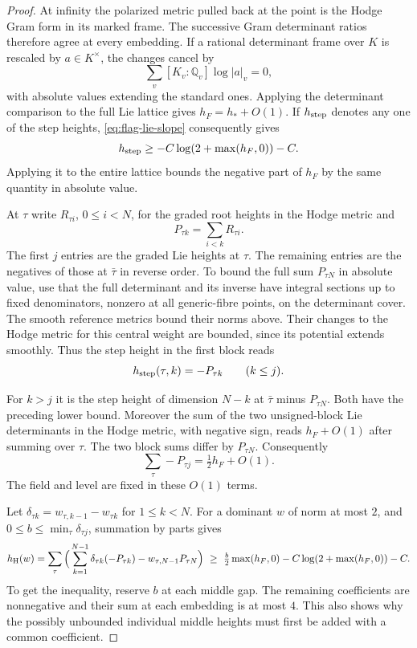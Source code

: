 \begin{proof}
At infinity the polarized metric pulled back at the point
is the Hodge Gram form in its marked frame. The successive Gram
determinant ratios therefore agree at every embedding. If a rational determinant frame over \(K\) is rescaled by \(a\in K^\times\), the changes cancel by
\[
 \sum_v[K_v:\mathbb Q_v]\log |a|_v=0,
\]
with absolute values extending the standard ones. Applying the determinant comparison to the full Lie lattice gives
\(h_F=h_*+O(1)\). If \(h_{\rm step}\) denotes any one of the step
heights, \eqref{eq:flag-lie-slope} consequently gives
\[
                    h_{\rm step}\ge-C\log(2+\max(h_F,0))-C .
\]
Applying it to the entire lattice bounds the negative part of
\(h_F\) by the same quantity in absolute value.
\label{cor:flag-point-heights-3}

At \(\tau\) write \(R_{\tau i}\), \(0\le i<N\), for the
graded root heights in the Hodge metric and
\[
 P_{\tau k}= \sum_{i<k} R_{\tau i}.
\]
The first \(j\) entries are the
graded Lie heights at \(\tau\). The remaining entries are
the negatives of those at \(\bar\tau\) in reverse order.
To bound the full sum \(P_{\tau N}\) in absolute value, use that
the full determinant and its inverse have integral sections up
to fixed denominators, nonzero at all generic-fibre points,
on the determinant cover. The smooth reference metrics bound their
norms above. Their changes to the Hodge metric for this central
weight are bounded, since its potential extends smoothly. Thus the step height in the first block reads
\[
 h_{\rm step}(\tau,k)=-P_{\tau k}\qquad(k\le j).
\]

For \(k>j\) it is the step height of dimension \(N-k\) at
\(\bar\tau\) minus \(P_{\tau N}\). Both have the preceding lower
bound. Moreover the sum of the two unsigned-block Lie determinants
in the Hodge metric, with negative sign, reads \(h_F+O(1)\) after
summing over \(\tau\). The two block sums differ by \(P_{\tau N}\).
Consequently
\[
  \sum_\tau -P_{\tau j}=\tfrac12 h_F+O(1).
\]
The field and level are fixed in these \(O(1)\) terms.
\label{cor:flag-point-heights-4}

Let \(\delta_{\tau k}=w_{\tau,k-1}-w_{\tau k}\) for \(1\le k<N\).
For a dominant \(w\) of norm at most \(2\), and
\(0\le b\le\min_\tau\delta_{\tau j}\), summation by parts gives
\[
 h_{\rm H}(w)=
 \sum_\tau\Big(\sum_{k=1}^{N-1}\delta_{\tau k}(-P_{\tau k})
                      -w_{\tau,N-1}P_{\tau N}\Big)
 \ \ge\ \tfrac b2\max(h_F,0)-C\log(2+\max(h_F,0))-C .
\]
To get the inequality, reserve \(b\) at each middle gap. The
remaining coefficients are nonnegative and their sum at each
embedding is at most \(4\). This also shows why the possibly
unbounded individual middle heights must first be added with a
common coefficient.


\end{proof}
